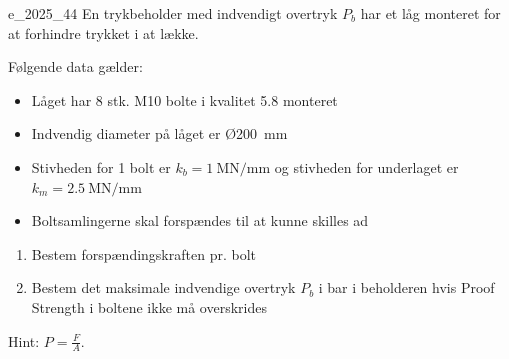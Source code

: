     \begin{problemwithimage}{e_2025_4}{4}
      En trykbeholder med indvendigt overtryk $P_b$ har et låg monteret for at forhindre trykket i at lække.
      
      Følgende data gælder:
      \begin{itemize}
        \item Låget har 8 stk. M10 bolte i kvalitet \num{5,8} monteret
        \item Indvendig diameter på låget er Ø\qty{200}{\mm}
        \item Stivheden for 1 bolt er $k_b = \qty{1}{\mega\N\per\mm}$ og stivheden for underlaget er $k_m = \qty{2,5}{\mega\N\per\mm}$
        \item Boltsamlingerne skal forspændes til at kunne skilles ad
      \end{itemize}

      \begin{enumerate}
        \item Bestem forspændingskraften pr. bolt
        \item Bestem det maksimale indvendige overtryk $P_b$ i \unit{\bar} i beholderen hvis Proof Strength i boltene ikke må overskrides
      \end{enumerate}

      Hint: $P = \frac{F}{A}$.
    \end{problemwithimage}

